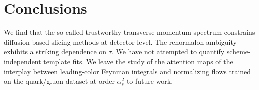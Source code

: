 \section{Conclusions}\label{sec:conclusions}

We find that the so-called trustworthy transverse momentum spectrum
constrains diffusion-based slicing methods at detector level. The
renormalon ambiguity exhibits a striking dependence on $\tau$. We have
not attempted to quantify scheme-independent template fits. We leave the
study of the attention maps of the interplay between leading-color
Feynman integrals and normalizing flows trained on the quark/gluon
dataset at order $\alpha_s^2$ to future work.

